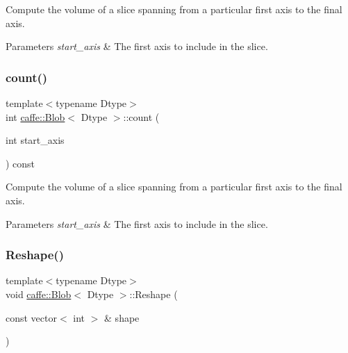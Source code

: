 Compute the volume of a slice spanning from a particular first axis to the final axis. 


\begin{DoxyParams}{Parameters}
{\em start\+\_\+axis} & The first axis to include in the slice. \\
\hline
\end{DoxyParams}
\mbox{\label{classcaffe_1_1_blob_aab573b2a70c26bf3b2ae65e42706003e}} 
\subsubsection{\texorpdfstring{count()}{count()}\hspace{0.1cm}{\footnotesize\ttfamily [4/4]}}
{\footnotesize\ttfamily template$<$typename Dtype$>$ \\
int \mbox{\hyperlink{classcaffe_1_1_blob}{caffe\+::\+Blob}}$<$ Dtype $>$\+::count (\begin{DoxyParamCaption}\item[{int}]{start\+\_\+axis }\end{DoxyParamCaption}) const\hspace{0.3cm}{\ttfamily [inline]}}



Compute the volume of a slice spanning from a particular first axis to the final axis. 


\begin{DoxyParams}{Parameters}
{\em start\+\_\+axis} & The first axis to include in the slice. \\
\hline
\end{DoxyParams}
\mbox{\label{classcaffe_1_1_blob_ac9ce456aa623ff3f4d24225a0db14404}} 
\subsubsection{\texorpdfstring{Reshape()}{Reshape()}\hspace{0.1cm}{\footnotesize\ttfamily [1/2]}}
{\footnotesize\ttfamily template$<$typename Dtype$>$ \\
void \mbox{\hyperlink{classcaffe_1_1_blob}{caffe\+::\+Blob}}$<$ Dtype $>$\+::Reshape (\begin{DoxyParamCaption}\item[{const vector$<$ int $>$ \&}]{shape }\end{DoxyParamCaption})}



